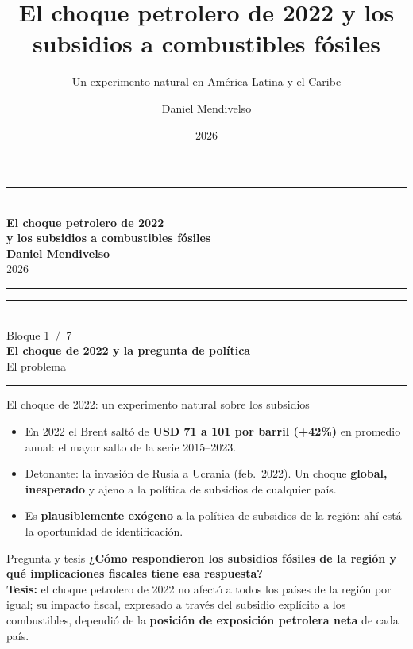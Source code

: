\documentclass[aspectratio=169,10pt]{beamer}
\title{El choque petrolero de 2022 y los subsidios a combustibles fósiles}
\subtitle{Un experimento natural en América Latina y el Caribe}
\author{Daniel Mendivelso}
\date{2026}
\newcommand{\key}[1]{{\bfseries\color{AcentoRojo}#1}}
\newcommand{\divisor}[3]{%
  {\setbeamertemplate{footline}{}%
   \begin{frame}[plain]
     \vfill
     \begin{center}
       {\color{AcentoRojo}\rule{2.6cm}{1.2pt}}\\[0.7em]
       {\scriptsize\color{GrisMedio}Bloque #1 \,/\, 7}\\[0.6em]
       {\Large\color{Carbon}\bfseries #2}\\[0.45em]
       {\color{GrisMedio}#3}\\[0.7em]
       {\color{AcentoRojo}\rule{2.6cm}{1.2pt}}
     \end{center}
     \vfill
   \end{frame}}}
\begin{document}
{
\begin{frame}[plain]
  \vfill
  \begin{center}
    {\color{AcentoRojo}\rule{3.5cm}{1.4pt}}\\[1.1em]
    {\color{Carbon}\bfseries El choque petrolero de 2022\\[0.2em]
     y los subsidios a combustibles fósiles}\\[2.4em]
    {\large\color{Carbon}\textbf{Daniel Mendivelso}}\\[0.4em]
    {\color{GrisMedio}2026}\\[1.1em]
    {\color{AcentoRojo}\rule{3.5cm}{1.4pt}}
  \end{center}
  \vfill
\end{frame}
}

\divisor{1}{El choque de 2022 y la pregunta de política}{El problema}

\begin{frame}{El choque de 2022: un experimento natural sobre los subsidios}
  \begin{itemize}
    \item En 2022 el Brent saltó de \key{USD 71 a 101 por barril (+42\%)} en promedio anual:
          el mayor salto de la serie 2015--2023.
    \item Detonante: la \alert{invasión de Rusia a Ucrania} (feb.\ 2022). Un choque
          \textbf{global, inesperado} y ajeno a la política de subsidios de cualquier país.
    \item Es \textbf{plausiblemente exógeno} a la política de subsidios de la región: ahí está
          la oportunidad de identificación.
  \end{itemize}

  \begin{block}{Pregunta y tesis}
    \textbf{¿Cómo respondieron los subsidios fósiles de la región y qué implicaciones fiscales
    tiene esa respuesta?}\\[0.3em]
    \textbf{Tesis:} el choque petrolero de 2022 no afectó a todos los países de la región por igual;
    su impacto fiscal, expresado a través del subsidio explícito a los combustibles, dependió de la
    \textbf{posición de exposición petrolera neta} de cada país.
  \end{block}

\end{frame}
\end{document}
